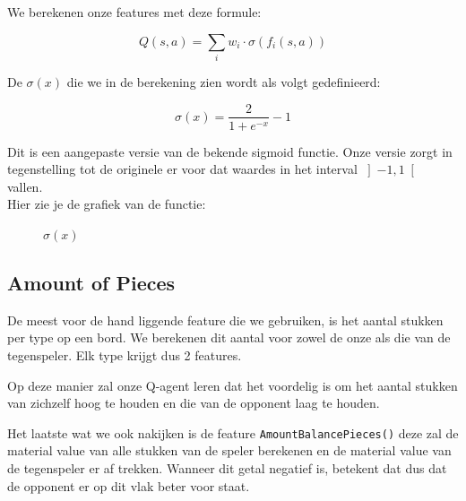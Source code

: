 \documentclass[a4paper,openany]{uantwerpenassignment}
\newcommand{\codeword}[1]{
    \colorbox{code}{\texttt{\textcolor{codetext}{#1}}}
}
\begin{document}
We berekenen onze features met deze formule:

$$
Q(s,a) = \sum_{i} w_{i} \cdot \sigma \left( f_i(s, a)\right)
$$

De $\sigma(x)$ die we in de berekening zien wordt als volgt gedefinieerd:

$$
\sigma(x) = \frac{2}{1 + e^{-x}} - 1
$$

Dit is een aangepaste versie van de bekende sigmoid\cite{WSF} functie. Onze versie zorgt in tegenstelling tot de originele er voor dat waardes in het interval $\left]-1,1\right[$ vallen.\\
Hier zie je de grafiek van de functie:

\begin{figure}[h]
    \centering
    \caption{$\sigma(x)$} \label{fig:sigmoid}
\end{figure}



\subsection{Amount of Pieces}
De meest voor de hand liggende feature die we gebruiken, is het aantal stukken per type op een bord. We berekenen dit aantal voor zowel de onze als die van de tegenspeler. Elk type krijgt dus 2 features.

Op deze manier zal onze Q-agent leren dat het voordelig is om het aantal stukken van zichzelf hoog te houden en die van de opponent laag te houden.

Het laatste wat we ook nakijken is de feature \codeword{AmountBalancePieces()} deze zal de material value van alle stukken van de speler berekenen en de material value van de tegenspeler er af trekken. Wanneer dit getal negatief is, betekent dat dus dat de opponent er op dit vlak beter voor staat.
\end{document}
